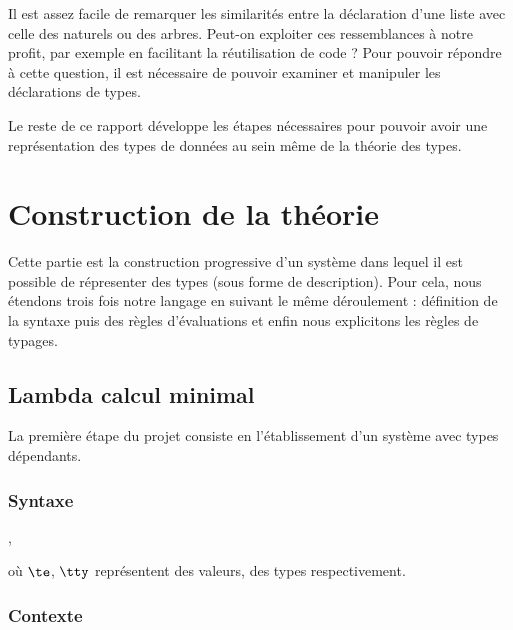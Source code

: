 \documentclass[11pt]{article}
\begin{document}
Il est assez facile de remarquer les similarités entre  la déclaration d'une liste avec celle des naturels ou des arbres. Peut-on exploiter ces ressemblances à notre profit, par exemple en facilitant la réutilisation de code ? Pour pouvoir répondre à cette question, il est nécessaire de pouvoir examiner et manipuler les déclarations de types.

Le reste de ce rapport développe les étapes nécessaires pour pouvoir avoir une représentation des types de données
au sein même de la théorie des types.


\section{Construction de la théorie}
\label{sec:orgd04bbf5}

Cette partie est la construction progressive d'un système dans lequel il est possible de répresenter des
types (sous forme de description). Pour cela, nous étendons trois fois notre langage en suivant le même déroulement : définition de la syntaxe puis des règles d'évaluations et enfin nous explicitons les règles de  typages.

\subsection{Lambda calcul minimal}
\label{sec:org996f0ed}

La première étape du projet consiste en l'établissement d'un système avec types dépendants.

\subsubsection{Syntaxe}
\label{sec:org849f4b7}

\begin{decl}{\te, \tty}
\end{decl}


où \(\te\), \(\tty\) représentent des valeurs, des types  respectivement.

\subsubsection{Contexte}
\label{sec:org306f4b8}
\end{document}
